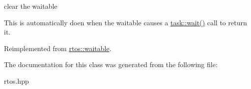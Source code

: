 clear the waitable 

This is automatically doen when the waitable causes a \hyperlink{classrtos_1_1task__base_a2590ba76480cecaff66282516fbeb1bb}{task\+::wait()} call to return it. 

Reimplemented from \hyperlink{classrtos_1_1waitable_ac4630398f50ba7e661a64bfc491ffa10}{rtos\+::waitable}.



The documentation for this class was generated from the following file\+:\begin{DoxyCompactItemize}
\item 
rtos.\+hpp\end{DoxyCompactItemize}
